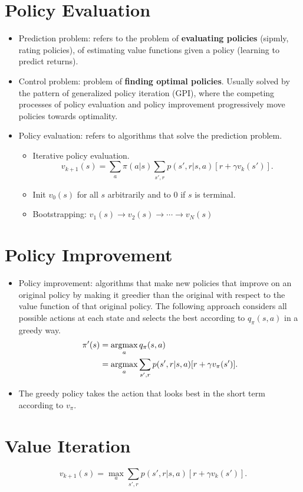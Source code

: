 \section{Policy Evaluation}
\begin{itemize}
	\item Prediction problem: refers to the problem of \textbf{evaluating policies} (sipmly, rating policies), of estimating value functions given a policy (learning to predict returns).
	\item Control problem: problem of \textbf{finding optimal policies}. Usually solved by the pattern of generalized policy iteration (GPI), where the competing processes of policy evaluation and policy improvement progressively move policies towards optimality.
	\item Policy evaluation: refers to algorithms that solve the prediction problem.
		\begin{itemize}
			\item Iterative policy evaluation.
				$$v_{k+1}(s)=\sum_{a}\pi(a|s)\sum_{s',r}p(s',r|s,a)[r + \gamma v_k(s')].$$ 
			\item Init $v_0(s)$ for all $s$ arbitrarily and to 0 if $s$ is terminal. 
			\item Bootstrapping: $v_1(s)\to v_2(s)\to\cdots\to v_N(s)$
		\end{itemize}
\end{itemize}

\section{Policy Improvement}
\begin{itemize}
	\item Policy improvement: algorithms that make new policies that improve on an original policy by making it greedier than the original with respect to the value function of that original policy. The following approach considers all possible actions at each state and selects the best according to $q_\pi(s,a)$ in a greedy way. 
		\begin{align*}
			\pi'(s) &= \operatorname*{\operatorname{argmax}}_a q_\pi(s,a)\\
			&= \operatorname*{\operatorname{argmax}}_a \sum_{s',r}p(s',r|s,a)[r + \gamma v_\pi(s')].
		\end{align*}
	\item The greedy policy takes the action that looks best in the short term according to $v_\pi$.
\end{itemize}

\section{Value Iteration}
$$v_{k+1}(s)=\max_a \sum_{s',r}p(s',r|s,a)[r + \gamma v_k(s')].$$ 
